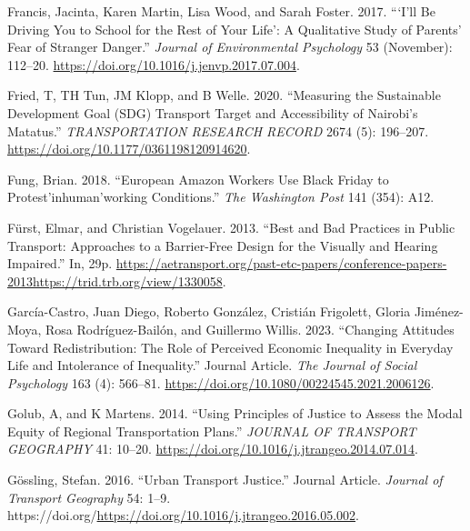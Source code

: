 \documentclass[12pt, oneside]{report}
\newlength{\cslhangindent}
\newlength{\cslentryspacingunit} %
\newenvironment{CSLReferences}[2] %
 {%
  \setlength{\parindent}{0pt}
  \ifodd #1
  \let\oldpar\par
  \def\par{\hangindent=\cslhangindent\oldpar}
  \fi
  \setlength{\parskip}{#2\cslentryspacingunit}
 }%
 {}
\begin{document}
\begin{CSLReferences}{1}{0}
\leavevmode{}%
Francis, Jacinta, Karen Martin, Lisa Wood, and Sarah Foster. 2017.
{``{`I'll Be Driving You to School for the Rest of Your Life'}: A
Qualitative Study of Parents' Fear of Stranger Danger.''} \emph{Journal
of Environmental Psychology} 53 (November): 112--20.
\url{https://doi.org/10.1016/j.jenvp.2017.07.004}.

\leavevmode{}%
Fried, T, TH Tun, JM Klopp, and B Welle. 2020. {``Measuring the
{Sustainable Development Goal} ({SDG}) {Transport Target} and
{Accessibility} of {Nairobi}'s {Matatus}.''} \emph{TRANSPORTATION
RESEARCH RECORD} 2674 (5): 196--207.
\url{https://doi.org/10.1177/0361198120914620}.

\leavevmode{}%
Fung, Brian. 2018. {``European Amazon Workers Use Black Friday to
Protest'inhuman'working Conditions.''} \emph{The Washington Post} 141
(354): A12.

\leavevmode{}%
Fürst, Elmar, and Christian Vogelauer. 2013. {``Best and Bad Practices
in Public Transport: Approaches to a Barrier-Free Design for the
Visually and Hearing Impaired.''} In, 29p.
\url{https://aetransport.org/past-etc-papers/conference-papers-2013https://trid.trb.org/view/1330058}.

\leavevmode{}%
García-Castro, Juan Diego, Roberto González, Cristián Frigolett, Gloria
Jiménez-Moya, Rosa Rodríguez-Bailón, and Guillermo Willis. 2023.
{``Changing Attitudes Toward Redistribution: The Role of Perceived
Economic Inequality in Everyday Life and Intolerance of Inequality.''}
Journal Article. \emph{The Journal of Social Psychology} 163 (4):
566--81. \url{https://doi.org/10.1080/00224545.2021.2006126}.

\leavevmode{}%
Golub, A, and K Martens. 2014. {``Using Principles of Justice to Assess
the Modal Equity of Regional Transportation Plans.''} \emph{JOURNAL OF
TRANSPORT GEOGRAPHY} 41: 10--20.
\url{https://doi.org/10.1016/j.jtrangeo.2014.07.014}.

\leavevmode{}%
Gössling, Stefan. 2016. {``Urban Transport Justice.''} Journal Article.
\emph{Journal of Transport Geography} 54: 1--9.
https://doi.org/\url{https://doi.org/10.1016/j.jtrangeo.2016.05.002}.


\end{CSLReferences}
\end{document}
